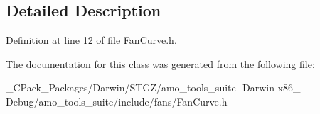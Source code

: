 \subsection{Detailed Description}


Definition at line 12 of file Fan\+Curve.\+h.



The documentation for this class was generated from the following file\+:\begin{DoxyCompactItemize}
\item 
\+\_\+\+C\+Pack\+\_\+\+Packages/\+Darwin/\+S\+T\+G\+Z/amo\+\_\+tools\+\_\+suite-\/-\/\+Darwin-\/x86\+\_-\/\+Debug/amo\+\_\+tools\+\_\+suite/include/fans/Fan\+Curve.\+h\end{DoxyCompactItemize}
